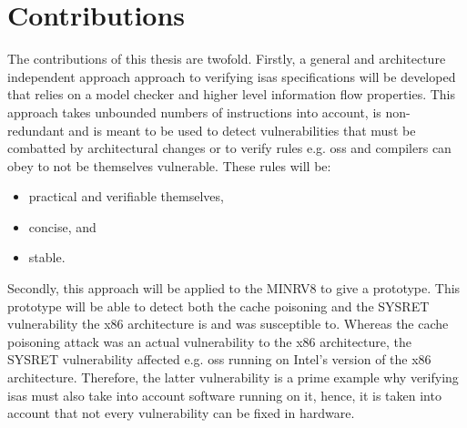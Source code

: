 \section{Contributions}

The contributions of this thesis are twofold.
Firstly, a general and architecture independent approach approach to verifying \glspl{isa} specifications will be developed that relies on a model checker and higher level information flow properties.
This approach takes unbounded numbers of instructions into account, is non-redundant and is meant to be used to detect vulnerabilities that must be combatted by architectural changes or to verify rules e.g. \glspl{os} and compilers can obey to not be themselves vulnerable.
These rules will be:
\begin{itemize}
    \item practical and verifiable themselves,
    \item concise, and
    \item stable.
\end{itemize}

Secondly, this approach will be applied to the MINRV8 to give a prototype.
This prototype will be able to detect both the cache poisoning and the SYSRET vulnerability the x86 architecture is and was susceptible to.
Whereas the cache poisoning attack was an actual vulnerability to the x86 architecture, the SYSRET vulnerability affected e.g. \glspl{os} running on Intel's version of the x86 architecture.
Therefore, the latter vulnerability is a prime example why verifying \glspl{isa} must also take into account software running on it, hence, it is taken into account that not every vulnerability can be fixed in hardware.
